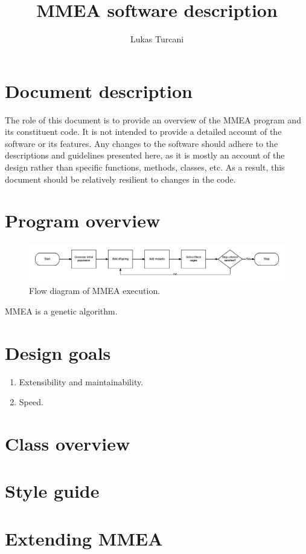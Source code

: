\documentclass[a4paper, titlepage]{article}
\title{MMEA software description}
\author{Lukas Turcani}
\begin{document}
\maketitle
\tableofcontents
\pagebreak

\section{Document description}
The role of this document is to provide an overview of the MMEA program and its constituent code. It is not intended to provide a detailed account of the software or its features. Any changes to the software should adhere to the descriptions and guidelines presented here, as it is mostly an account of the design rather than specific functions, methods, classes, etc. As a result, this document should be relatively resilient to changes in the code.
       
\section{Program overview}

\begin{figure}[h]
	\centering
	\includegraphics[width=\textwidth]{./figures/program_overview/MMEA_flow_horizontal.png}
	\caption{Flow diagram of MMEA execution.}
	\label{flow_diagram}
\end{figure}

MMEA is a genetic algorithm.

\section{Design goals}

\begin{enumerate}
	\item Extensibility and maintainability.
	\item Speed.
\end{enumerate}

\section{Class overview}

\section{Style guide}

\section{Extending MMEA}
\end{document}
